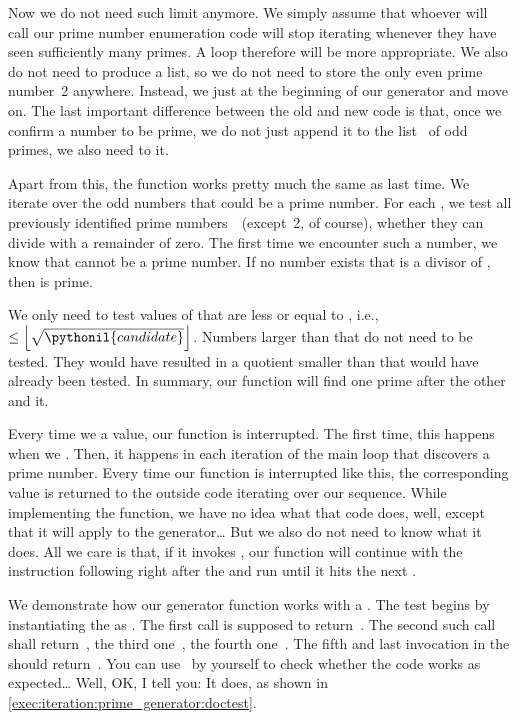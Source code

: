 Now we do not need such limit anymore.
We simply assume that whoever will call our prime number enumeration code will stop iterating whenever they have seen sufficiently many primes.
A  loop therefore will be more appropriate.
We also do not need to produce a list, so we do not need to store the only even prime number~2 anywhere.
Instead, we just  at the beginning of our generator and move on.
The last important difference between the old and new code is that, once we confirm a number to be prime, we do not just append it to the list~ of odd primes, we also need to  it.

Apart from this, the function works pretty much the same as last time.
We iterate over the odd numbers  that could be a prime number.
For each , we test all previously identified prime numbers~~(except~2, of course), whether they can divide  with a remainder of zero.
The first time we encounter such a number, we know that  cannot be a prime number.
If no number  exists that is a divisor of , then  is prime.%
%
\begin{sloppypar}%
We only need to test values of  that are less or equal to , i.e., $\leq\left\lfloor\sqrt{\pythonil{candidate}}\right\rfloor$.
Numbers larger than that do not need to be tested.
They would have resulted in a quotient smaller than  that would have already been tested.
In summary, our function will find one prime after the other and  it.%
\end{sloppypar}%
%
Every time we  a value, our function is interrupted.
The first time, this happens when we .
Then, it happens in each iteration of the main loop that discovers a prime number.
Every time our function is interrupted like this, the corresponding value is returned to the outside code iterating over our sequence.
While implementing the function, we have no idea what that code does, well, except that it will apply  to the generator{\dots}
But we also do not need to know what it does.
All we care is that, if it invokes , our function will continue with the instruction following right after the  and run until it hits the next .

We demonstrate how our generator function works with a .
The test begins by instantiating the  as .
The first  call is supposed to return~.
The second such call shall return~, the third one~, the fourth one~.
The fifth and last  invocation in the  should return~.
You can use \pytest\ by yourself to check whether the code works as expected\dots%
Well, OK, I tell you:
It does, as shown in \cref{exec:iteration:prime_generator:doctest}.

